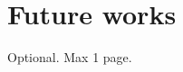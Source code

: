\documentclass[12pt,a4paper,openright,twoside]{book}
\begin{document}
\section{Future works}


\backmatter

\nocite{*} %




\begin{acknowledgements} %
Optional. Max 1 page.
\end{acknowledgements}
\end{document}
